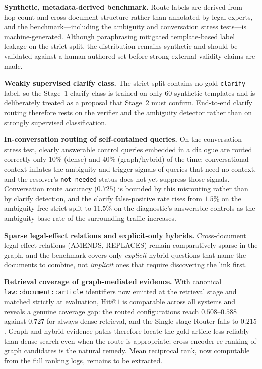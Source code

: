 \documentclass[pdflatex,sn-mathphys-num]{sn-jnl}
\begin{document}
\noindent\textbf{Synthetic, metadata-derived benchmark.} Route labels are
derived from hop-count and cross-document structure rather than annotated by
legal experts, and the benchmark---including the ambiguity and conversation
stress tests---is machine-generated. Although paraphrasing mitigated
template-based label leakage on the strict split, the distribution remains
synthetic and should be validated against a human-authored set before strong
external-validity claims are made.

\noindent\textbf{Weakly supervised clarify class.} The strict split contains
no gold \texttt{clarify} label, so the Stage~1 clarify class is trained on
only $60$ synthetic templates and is deliberately treated as a proposal that
Stage~2 must confirm. End-to-end clarify routing therefore rests on the
verifier and the ambiguity detector rather than on strongly supervised
classification.

\noindent\textbf{In-conversation routing of self-contained queries.} On the
conversation stress test, clearly answerable control queries embedded in a
dialogue are routed correctly only $10\%$ (dense) and $40\%$ (graph/hybrid)
of the time: conversational context inflates the ambiguity and trigger
signals of queries that need no context, and the resolver's
\texttt{not\_needed} status does not yet suppress those signals. Conversation
route accuracy ($0.725$) is bounded by this misrouting rather than by
clarify detection, and the clarify false-positive rate rises from $1.5\%$ on
the ambiguity-free strict split to $11.5\%$ on the diagnostic's answerable
controls as the ambiguity base rate of the surrounding traffic increases.

\noindent\textbf{Sparse legal-effect relations and explicit-only hybrids.}
Cross-document legal-effect relations (\textsc{AMENDS}, \textsc{REPLACES})
remain comparatively sparse in the graph, and the benchmark covers only
\emph{explicit} hybrid questions that name the documents to combine, not
\emph{implicit} ones that require discovering the link first.

\noindent\textbf{Retrieval coverage of graph-mediated evidence.} With
canonical \texttt{law::document::article} identifiers now emitted at the
retrieval stage and matched strictly at evaluation, Hit@$1$ is comparable
across all systems and reveals a genuine coverage gap: the routed
configurations reach $0.508$--$0.588$ against $0.727$ for always-dense
retrieval, and the Single-stage Router falls to $0.215$. Graph and hybrid
evidence paths therefore locate the gold article less reliably than dense
search even when the route is appropriate; cross-encoder re-ranking of graph
candidates is the natural remedy. Mean reciprocal rank, now computable from
the full ranking logs, remains to be extracted.
\end{document}
